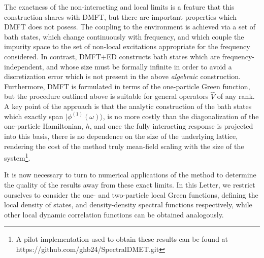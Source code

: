 \documentclass[aps,twocolumn,nobibnotes]{revtex4}
\begin{document}
The exactness of the non-interacting and local limits is a feature that this construction shares with DMFT, but there are important properties which 
DMFT does not posess. The coupling to the environment
is achieved via a set of bath states, which change continuously with frequency, and which couple the impurity space to the set of non-local excitations appropriate for the frequency considered. 
In contrast, DMFT+ED constructs bath states which are
frequency-independent, and whose size must be formally infinite in order to avoid a discretization error which is not present in the above {\em algebraic} 
construction. Furthermore, DMFT is formulated in terms of the one-particle Green function, but the procedure outlined above is suitable for 
general operators ${\hat V}$ of any rank. 
A key point of the approach is that the analytic construction
of the bath states which exactly span $|\phi^{(1)}(\omega) \rangle$, is no more costly than the diagonalization of the one-particle Hamiltonian, $h$, 
and once the fully interacting response is projected into this basis, there is no dependence on the size of the underlying lattice, rendering 
the cost of the method truly mean-field scaling with the size of the system\footnote{A pilot implementation used to obtain these results can be found at https://github.com/ghb24/SpectralDMET.git}. 

It is now necessary to turn to numerical applications of the method to determine the quality of the results away from these exact limits. 
In this Letter, we restrict ourselves to consider the one- and two-particle local Green functions,
defining the local density of states, and density-density spectral functions respectively, while other local dynamic correlation functions can be obtained analogously.
\end{document}
